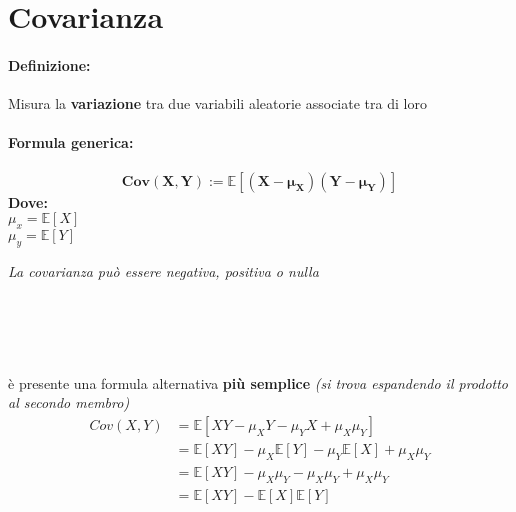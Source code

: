 \documentclass[]{article}
\newcommand{\ev}{\mathbb{E}[X]}
\renewcommand{\ev}[1]{\mathbb{E}[#1]}
\newcommand{\definizione}{\paragraph{Definizione:}}
\newcommand{\formula}{\paragraph{Formula generica:}}
\begin{document}
    \section{Covarianza}
    \definizione Misura la \textbf{variazione} tra due variabili aleatorie associate tra di loro
    \formula \[ \boldsymbol{Cov(X,Y) := \ev{(X - \mu_X) (Y - \mu_Y)}} \]
    \textbf{Dove:} \\
    $ \mu_x = \ev{X} $ \\
    $ \mu_y = \ev{Y} $ \\
    \linebreak[4]
    \centerline{\textit{La covarianza può essere negativa, positiva o nulla } }
     \\
     \\
     \\ \\
    è presente una formula alternativa \textbf{più semplice} \textit{(si trova espandendo il prodotto al secondo membro)}
    \begin{equation*}
        \begin{split} 
            Cov(X, Y) &= \ev{XY - \mu_XY - \mu_YX + \mu_X \mu_Y} \\
            & = \ev{XY} - \mu_X \ev{Y} - \mu_Y \ev{X} + \mu_X \mu_Y \\ 
            & = \ev{XY} - \mu_X \mu_Y - \mu_X \mu_Y  + \mu_X \mu_Y  \\
            & = \ev{XY} - \ev{X} \ev{Y}
        \end{split}
    \end{equation*}
\end{document}
